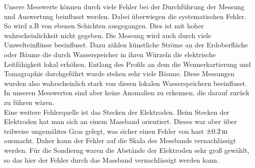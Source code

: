 Unsere Messwerte können durch viele Fehler bei der Durchführung der Messung und Auswertung beinflusst werden. Dabei überwiegen die systematischen Fehler. So wird z.B von ebenen Schichten ausgegangen. Dies ist mit hoher wahrscheinlichkeit nicht gegeben. 
Die Messung wird auch durch viele Umwelteinflüsse beeinflusst. Dazu zählen künstliche Ströme an der Erdoberfläche oder Bäume die durch Wasserspeicher in ihren Würzeln die elektrische Leitfähigkeit lokal erhöhen. Entlang des Profils an dem die Wennerkartierung und Tomagraphie durchgeführt wurde stehen sehr viele Bäume. Diese Messungen wurden also wahrscheinlich stark von diesen lokalen Wasserspeichern beeinflusst. In unseren Messwerten sind aber keine Anomalien zu erkennen, die darauf zurück zu führen wären.\\
Eine weitere Fehlerquelle ist das Stecken der Elektroden. Beim Stecken der Elektroden hat man sich an einem Massband orientiert. Dieses war aber über teilweise ungemähtes Gras gelegt, was sicher einen Fehler von hast $\SI{\pm 0,2}{m}$ ausmacht. Daher kann der Fehler auf die Skala des Messbands vernachlässigt werden.  
Für die Sondierng waren die Abstände der Elektroden sehr groß gewählt, so das hier der Fehler durch das Massband vernachlässigt werden kann.

